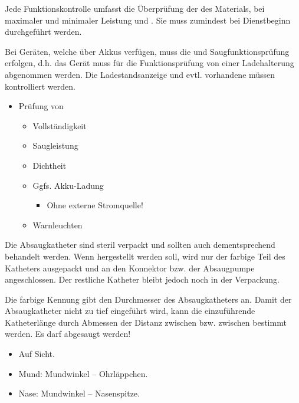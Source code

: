 {
Jede Funktionskontrolle umfasst die Überprüfung der  des
Materials,  bei maximaler und minimaler Leistung und
. Sie muss zumindest bei Dienstbeginn durchgeführt werden.

Bei Geräten, welche über Akkus verfügen, muss die  und
Saugfunktionsprüfung 
erfolgen, d.h. das Gerät muss für die Funktionsprüfung von einer Ladehalterung
abgenommen werden. Die Ladestandsanzeige und evtl. vorhandene
 müssen kontrolliert werden. }{
\begin{itemize}
   \item Prüfung von
   \begin{itemize}
      \item Vollständigkeit
      \item Saugleistung
      \item Dichtheit
      \item Ggfs. Akku-Ladung
      \begin{itemize}
         \item Ohne externe Stromquelle!
      \end{itemize}
      \item Warnleuchten
   \end{itemize}
\end{itemize}
}{}{}{}

{
Die Absaugkatheter sind steril verpackt und sollten
auch dementsprechend behandelt werden. Wenn 
 hergestellt werden soll, wird nur
der farbige Teil des Katheters ausgepackt und an den
Konnektor bzw.  der Absaugpumpe angeschlossen.
Der restliche Katheter bleibt jedoch noch in der Verpackung. 

Die farbige Kennung gibt
den Durchmesser des Absaugkatheters an. Damit der
Absaugkatheter nicht zu tief eingeführt wird, kann die
einzuführende Katheterlänge durch Abmessen der Distanz
zwischen  bzw. zwischen  bestimmt werden. Es darf  abgesaugt
werden! }{
\begin{itemize}
    \item Auf Sicht.
    \item Mund: Mundwinkel -- Ohrläppchen.
    \item Nase: Mundwinkel -- Nasenspitze.
\end{itemize}
}
{}
{}
{}

